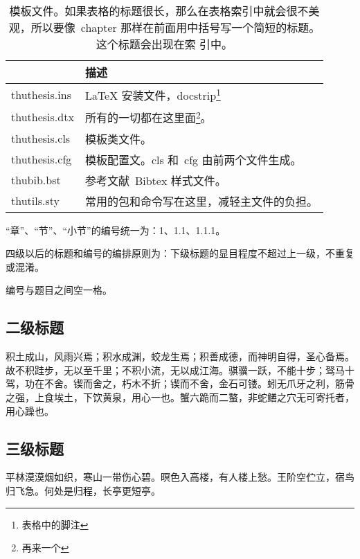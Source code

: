     \begin{table}[htb]
  \centering
  \begin{minipage}[t]{0.8\linewidth} 
  \caption[模板文件]{模板文件。如果表格的标题很长，那么在表格索引中就会很不美
    观，所以要像~chapter 那样在前面用中括号写一个简短的标题。这个标题会出现在索
    引中。}
  \label{tab:template-files}
    \begin{tabular*}{\linewidth}{lp{10cm}}
      \toprule[1.5pt]
      {} & {\bf 描述} \\\midrule[1pt]
      thuthesis.ins & \LaTeX{} 安装文件，docstrip\footnote{表格中的脚注} \\
      thuthesis.dtx & 所有的一切都在这里面\footnote{再来一个}。\\
      thuthesis.cls & 模板类文件。\\
      thuthesis.cfg & 模板配置文。cls 和~cfg 由前两个文件生成。\\
      thubib.bst    & 参考文献~Bibtex 样式文件。\\
      thutils.sty   & 常用的包和命令写在这里，减轻主文件的负担。\\
      \bottomrule[1.5pt]
    \end{tabular*}
  \end{minipage}
\end{table}

    “章”、“节”、“小节”的编号统一为：1、1.1、1.1.1。
    



    四级以后的标题和编号的编排原则为：下级标题的显目程度不超过上一级，不重复或混淆。

    编号与题目之间空一格。

    \subsection{二级标题}
    

        积土成山，风雨兴焉；积水成渊，蛟龙生焉；积善成德，而神明自得，圣心备焉。故不积跬步，无以至千里；不积小流，无以成江海。骐骥一跃，不能十步；驽马十驾，功在不舍。锲而舍之，朽木不折；锲而不舍，金石可镂。蚓无爪牙之利，筋骨之强，上食埃土，下饮黄泉，用心一也。蟹六跪而二螯，非蛇鳝之穴无可寄托者，用心躁也。
         

        \subsection{三级标题}

        平林漠漠烟如织，寒山一带伤心碧。暝色入高楼，有人楼上愁。王阶空伫立，宿鸟归飞急。何处是归程，长亭更短亭。


